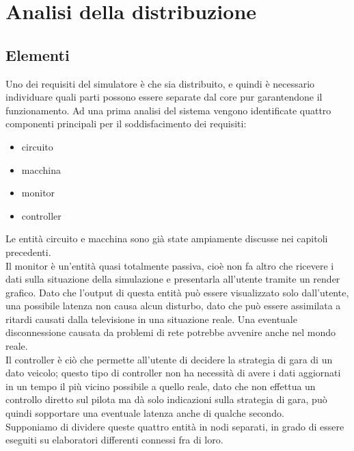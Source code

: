 \chapter{Analisi della distribuzione} %

\label{Chapter5} %



\section{Elementi}

Uno dei requisiti del simulatore è che sia distribuito, e quindi è necessario individuare quali parti possono essere separate dal core pur garantendone il funzionamento.
Ad una prima analisi del sistema vengono identificate quattro componenti principali per il soddisfacimento dei requisiti:
\begin{itemize}
 \item circuito
 \item macchina
 \item monitor
 \item controller
\end{itemize}
Le entità circuito e macchina sono già state ampiamente discusse nei capitoli precedenti. \\ %
Il monitor è un'entità quasi totalmente passiva, cioè non fa altro che ricevere i dati sulla situazione della simulazione e presentarla all’utente tramite un render grafico. Dato che l’output di questa entità può essere visualizzato solo dall’utente, una possibile latenza non causa alcun disturbo, dato che può essere assimilata a ritardi causati dalla televisione in una situazione reale. Una eventuale disconnessione causata da problemi di rete potrebbe avvenire anche nel mondo reale. \\
Il controller è ciò che permette all’utente di decidere la strategia di gara di un dato veicolo; questo tipo di controller non ha necessità di avere i dati aggiornati in un tempo il più vicino possibile a quello reale, dato che non effettua un controllo diretto sul pilota ma dà solo indicazioni sulla strategia di gara, può quindi sopportare una eventuale latenza anche di qualche secondo. \\
Supponiamo di dividere queste quattro entità in nodi separati, in grado di essere eseguiti su elaboratori differenti connessi fra di loro.
 
